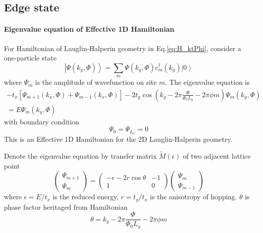 \documentclass[12pt,a4paper]{article}
\newcommand{\ket}[1]{\left|{#1}\right\rangle}
\begin{document}
\subsection{Edge state}

\paragraph{Eigenvalue equation of Effective 1D Hamiltonian}

    For Hamiltonian of Lauglin-Halperin geometry in Eq.\eqref{eq:H_ktPhi}, consider a one-particle state
    \[
        \ket{\Psi(k_y, \Phi)}
        = \sum_m \Psi(k_y, \Phi) c_m^{\dagger}(k_y) \ket{0}
    \]
    where $\Psi_m$ is the amplitude of wavefunction on site $m$. The eigenvalue equation is
    \begin{equation}
    \label{eq:H_LH}
    \begin{aligned}
        - t_x \left[\Psi_{m+1}(k_x, \Phi) + \Psi_{m-1}(k_x, \Phi)\right]
        - 2t_y \cos\left(k_y - 2\pi\frac{\Phi}{\Phi_0L_y} - 2\pi\phi m\right) \Psi_m(k_y, \Phi) \\
        = E \Psi_m(k_y, \Phi)
    \end{aligned}
    \end{equation}
    with boundary condition
    \[
        \Psi_0 = \Psi_{L_x} = 0
    \]
    This is an Effective 1D Hamiltonian for the 2D Lauglin-Halperin geometry.

    Denote the eigenvalue equation by transfer matrix $\tilde{M}(\epsilon)$ of two adjacent lattice point
    \begin{equation}
        \begin{pmatrix}
            \Psi_{m+1} \\ \Psi_m
        \end{pmatrix}
        =
        \begin{pmatrix}
            -\epsilon -2r\cos\theta & -1 \\ 1 & 0
        \end{pmatrix}
        \begin{pmatrix}
            \Psi_{m} \\ \Psi_{m-1}
        \end{pmatrix}
    \end{equation}
    where $\epsilon=E/t_x$ is the reduced energy, $r=t_y/t_x$ is the anisotropy of hopping. $\theta$ is phase factor heritaged from Hamiltonian
    \[
        \theta = k_y - 2\pi\frac{\Phi}{\Phi_0L_y} - 2\pi \phi m
    \]
\end{document}
